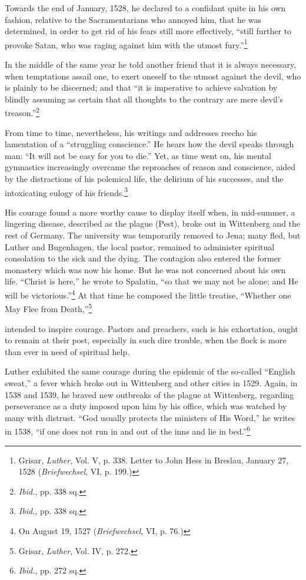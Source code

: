 Towards the end of January, 1528, he declared to a confidant quite
in his own fashion, relative to the Sacramentarians who annoyed him,
that he was determined, in order to get rid of his fears still more
effectively, “still further to provoke Satan, who was raging against
him with the utmost fury.”\footnote
{Grisar, \textit{Luther}, Vol. V, p. 338. Letter to John Hess in Breslau, January 27, 1528
(\textit{Briefwechsel}, VI, p. 199.)}

In the middle of the same year he told another friend that it is
always necessary, when temptations assail one, to exert oneself to the
utmost against the devil, who is plainly to be discerned; and that
“it is imperative to achieve salvation by blindly assuming as certain
that all thoughts to the contrary are mere devil’s treason.”\footnote{\textit{Ibid.}, pp. 338 sq.}

From time to time, nevertheless, his writings and addresses reecho
his lamentation of a “struggling conscience.” He hears how the devil
speaks through man: “It will not be easy for you to die.” Yet, as
time went on, his mental gymnastics increasingly overcame the reproaches
of reason and conscience, aided by the distractions of his
polemical life, the delirium of his successes, and the intoxicating
eulogy of his friends.\footnote{\textit{Ibid.}, pp. 338 sq.}

His courage found a more worthy cause to display itself when, in
mid-summer, a lingering disease, described as the plague (Pest), broke
out in Wittenberg and the rest of Germany. The university was
temporarily removed to Jena; many fled, but Luther and Bugenhagen,
the local pastor, remained to administer spiritual consolation
to the sick and the dying. The contagion also entered the former
monastery which was now his home. But he was not concerned
about his own life. “Christ is here,” he wrote to Spalatin, “so that we
may not be alone; and He will be victorious.”\footnote{On August 19, 1527 (\textit{Briefwechsel}, VI, p. 76.)}
 At that time he
composed the little treatise, “Whether one May Flee from Death,”\footnote{Grisar, \textit{Luther}, Vol. IV, p. 272.}

intended to inspire courage. Pastors and preachers, such is his exhortation,
ought to remain at their post, especially in such dire
trouble, when the flock is more than ever in need of spiritual help.

Luther exhibited the same courage during the epidemic of the so-called
“English sweat,” a fever which broke out in Wittenberg and
other cities in 1529. Again, in 1538 and 1539, he braved new outbreaks
of the plague at Wittenberg, regarding perseverance as a duty
imposed upon him by his office, which was watched by many with distrust.
“God usually protects the ministers of His Word,” he writes in
1538, “if one does not run in and out of the inns and lie in bed.”\footnote{\textit{Ibid.}, pp. 272 sq.}

